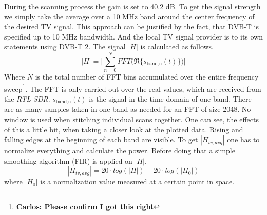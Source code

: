 \documentclass[conference]{IEEEtran}
\newcommand{\cp}[1]{\footnote{{\bf Carlos: #1}}}
\begin{document}
During the scanning process	the gain is set to 40.2 dB. To get the
signal strength we simply take the average over a 10 MHz band around the
center frequency of the desired TV signal. This approach can be justified by the fact, that DVB-T is specified up to 10 MHz bandwidth. And the local TV signal provider is to its own statements using DVB-T 2. The signal \ensuremath{|H|} is calculated as follows.
\begin{equation}
	|H| = \Biggl| \sum_{n=0}^N FFT\bigl( \Re\{ s_{\text{band,n}}(t) \} \bigr) \Biggr|
\end{equation}     
Where \ensuremath{N} is the total number of FFT bins accumulated over
the entire frequency sweep\cp{Please confirm I got this right}. The FFT
is only carried out over the real values, which are received from the
\textit{RTL-SDR}. \ensuremath{s_{\text{band,n}}(t)} is the signal in the
time domain of one band. There are as many samples taken in one band as
needed for an FFT of size 2048. No window is used when stitching
individual scans together. One can see, the effects of this a little bit, when taking a closer look at the plotted data. Rising and falling edges at the beginning of each band are visible. To get \ensuremath{|H_{tv,avg}|} one has to normalize everything and calculate the power. Before doing that a simple smoothing algorithm (FIR) is applied on \ensuremath{|H|}.
\begin{equation}
	|H_{tv,avg}| = 20 \cdot log (|H|) - 20 \cdot log(|H_0|)
\end{equation}   
where \ensuremath{|H_0|} is a normalization value measured at a certain
point in space. 
\end{document}
